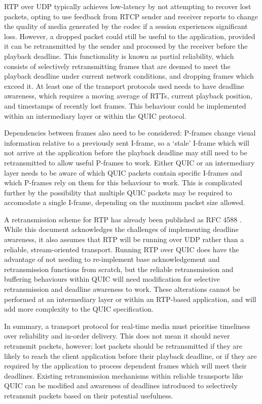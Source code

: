 \documentclass{mprop}
\begin{document}
RTP over UDP typically achieves low-latency by not attempting to recover lost packets, opting to use feedback from RTCP sender and receiver reports to change the quality of media generated by the codec if a session experiences significant loss. However, a dropped packet could still be useful to the application, provided it can be retransmitted by the sender and processed by the receiver before the playback deadline. This functionality is known as partial reliability, which consists of selectively retransmitting frames that are deemed to meet the playback deadline under current network conditions, and dropping frames which exceed it. At least one of the transport protocols used needs to have deadline awareness, which requires a moving average of RTTs, current playback position, and timestamps of recently lost frames. This behaviour could be implemented within an intermediary layer or within the QUIC protocol.

Dependencies between frames also need to be considered: P-frames change visual information relative to a previously sent I-frame, so a `stale' I-frame which will not arrive at the application before the playback deadline may still need to be retransmitted to allow useful P-frames to work. Either QUIC or an intermediary layer needs to be aware of which QUIC packets contain specific I-frames and which P-frames rely on them for this behaviour to work. This is complicated further by the possibility that multiple QUIC packets may be required to accomodate a single I-frame, depending on the maximum packet size allowed.

A retransmission scheme for RTP has already been published as RFC 4588 \cite{RTP-retransmission-RFC}. While this document acknowledges the challenges of implementing deadline awareness, it also assumes that RTP will be running over UDP rather than a reliable, stream-oriented transport. Running RTP over QUIC does have the advantage of not needing to re-implement base acknowledgement and retransmission functions from scratch, but the reliable retransmission and buffering behaviours within QUIC will need modification for selective retransmission and deadline awareness to work. These alterations cannot be performed at an intermediary layer or within an RTP-based application, and will add more complexity to the QUIC specification.

In summary, a transport protocol for real-time media must prioritise timeliness over reliability and in-order delivery. This does not mean it should never retransmit packets, however; lost packets should be retransmitted if they are likely to reach the client application before their playback deadline, or if they are required by the application to process dependent frames which will meet their deadlines. Existing retransmission mechanisms within reliable transports like QUIC can be modified and awareness of deadlines introduced to selectively retransmit packets based on their potential usefulness.
\end{document}
